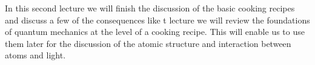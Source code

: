 In this second lecture we will finish the discussion of the basic cooking recipes and discuss a few of the consequences like t lecture we will review the foundations of quantum mechanics at the level of a cooking recipe. This will enable us to use them later for the discussion of the atomic structure and interaction between atoms and light.